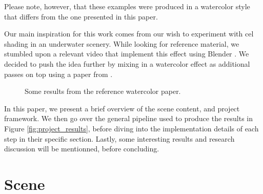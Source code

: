 \documentclass{article}
\begin{document}
\noindent
Please note, however, that these examples were produced in a watercolor style that differs from the one 
presented in this paper.

\medskip \par
\noindent
Our main inspiration for this work comes from our wish to experiment with cel shading in an underwater 
scenery. While looking for reference material, we stumbled upon a relevant video that implement
this effect using Blender \cite{caustics_video}. We decided to push the idea further by mixing in a watercolor
effect as additional passes on top using a paper from \cite{watercolor_paper}.

\begin{figure}[h]
    \centering
    \hfill
    \caption{Some results from the reference watercolor paper.}
    \label{fig:watercolor_architecture}
\end{figure}

\medskip \par
\noindent
In this paper, we present a brief overview of the scene content, and project framework. 
We then go over the general pipeline used to produce the results in Figure \ref{fig:project_results}, before
diving into the implementation details of each step in their specific section. Lastly, some interesting 
results and research discussion will be mentionned, before concluding.

\section{Scene}
\end{document}
